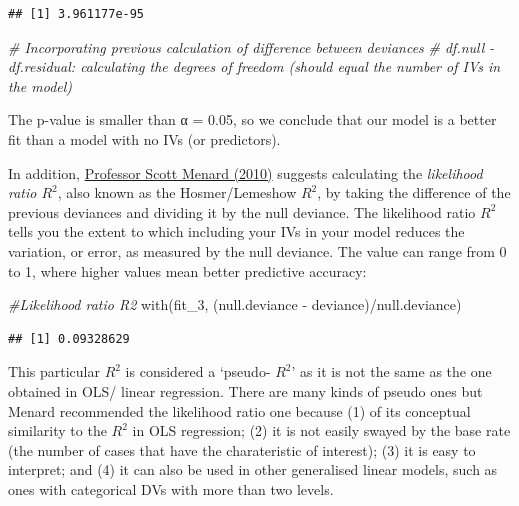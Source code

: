 \documentclass[
]{book}
\newenvironment{Shaded}{\begin{snugshade}}{\end{snugshade}}
\newcommand{\CommentTok}[1]{\textcolor[rgb]{0.56,0.35,0.01}{\textit{#1}}}
\newcommand{\FunctionTok}[1]{\textcolor[rgb]{0.00,0.00,0.00}{#1}}
\newcommand{\NormalTok}[1]{#1}
\newcommand{\SpecialCharTok}[1]{\textcolor[rgb]{0.00,0.00,0.00}{#1}}
\begin{document}
\begin{verbatim}
## [1] 3.961177e-95
\end{verbatim}

\begin{Shaded}
\begin{Highlighting}[]
\CommentTok{\# Incorporating previous calculation of difference between deviances}
\CommentTok{\# df.null {-} df.residual: calculating the degrees of freedom (should equal the number of IVs in the model)}
\end{Highlighting}
\end{Shaded}

The p-value is smaller than α = 0.05, so we conclude that our model is a better fit than a model with no IVs (or predictors).

In addition, \href{https://methods.sagepub.com/book/logistic-regression-from-introductory-to-advanced-concepts-and-applications}{Professor Scott Menard (2010)} suggests calculating the \emph{likelihood ratio \(R^2\)}, also known as the Hosmer/Lemeshow \(R^2\), by taking the difference of the previous deviances and dividing it by the null deviance. The likelihood ratio \(R^2\) tells you the extent to which including your IVs in your model reduces the variation, or error, as measured by the null deviance. The value can range from 0 to 1, where higher values mean better predictive accuracy:

\begin{Shaded}
\begin{Highlighting}[]
\CommentTok{\#Likelihood ratio R2}
\FunctionTok{with}\NormalTok{(fit\_3, (null.deviance }\SpecialCharTok{{-}}\NormalTok{ deviance)}\SpecialCharTok{/}\NormalTok{null.deviance)}
\end{Highlighting}
\end{Shaded}

\begin{verbatim}
## [1] 0.09328629
\end{verbatim}

This particular \(R^2\) is considered a `pseudo- \(R^2\)' as it is not the same as the one obtained in OLS/ linear regression. There are many kinds of pseudo ones but Menard recommended the likelihood ratio one because (1) of its conceptual similarity to the \(R^2\) in OLS regression; (2) it is not easily swayed by the base rate (the number of cases that have the charateristic of interest); (3) it is easy to interpret; and (4) it can also be used in other generalised linear models, such as ones with categorical DVs with more than two levels.
\end{document}
